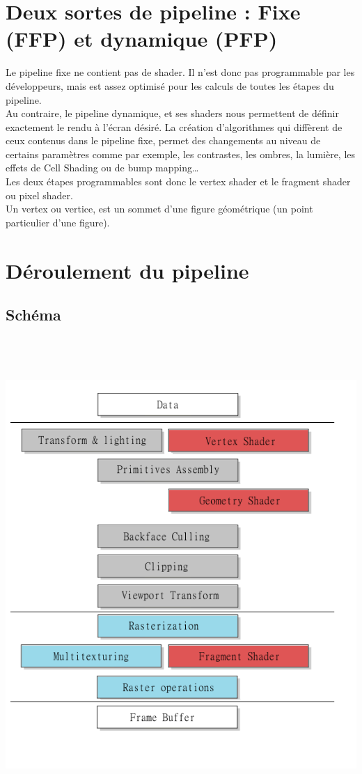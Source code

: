 \section{Deux sortes de pipeline : Fixe (FFP) et dynamique (PFP)}
Le pipeline fixe ne contient pas de shader. Il n’est donc pas programmable par les développeurs, mais est assez optimisé pour les calculs de toutes les étapes du pipeline.\\
Au contraire, le pipeline dynamique, et ses shaders nous permettent de définir exactement le rendu à l’écran désiré. La création d’algorithmes qui diffèrent de ceux contenus dans le pipeline fixe, permet des changements au niveau de certains paramètres comme par exemple, les contrastes, les ombres, la lumière, les effets de Cell Shading ou de bump mapping…\\
Les deux étapes programmables sont donc le vertex shader et le fragment shader ou pixel shader.\\
Un vertex ou vertice, est un sommet d’une figure géométrique (un point particulier d’une figure).

\section{Déroulement du pipeline}
\subsection{Schéma}
\includegraphics[width=14cm,height=180mm]{leo/images/pipeline.png}
